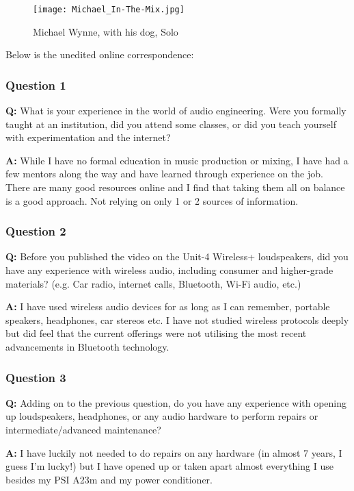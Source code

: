 \documentclass[conference]{IEEEtran}
\begin{document}
\begin{figure}[htbp]
    \centering
    \texttt{[image: Michael\_In-The-Mix.jpg]}
    \caption{Michael Wynne, with his dog, Solo}
    \label{fig:in-the-mix_portrait}
\end{figure}

Below is the unedited online correspondence:

\subsubsection*{Question 1}
\textbf{Q:} What is your experience in the world of audio engineering. Were you formally
taught at an institution, did you attend some classes, or did you teach yourself with
experimentation and the internet?

\textbf{A:} While I have no formal education in music production or mixing, I have had a few
mentors along the way and have learned through experience on the job. There are many good
resources online and I find that taking them all on balance is a good approach. Not relying
on only 1 or 2 sources of information. \cite{wynne_interviewing_2023}

\subsubsection*{Question 2}
\textbf{Q:} Before you published the video on the Unit-4 Wireless+ loudspeakers, did you have
any experience with wireless audio, including consumer and higher-grade materials? (e.g. Car
radio, internet calls, Bluetooth, Wi-Fi audio, etc.)


\textbf{A:}  I have used wireless audio devices for as long as I can remember, portable
speakers, headphones, car stereos etc. I have not studied wireless protocols deeply but did
feel that the current offerings were not utilising the most recent advancements in Bluetooth
technology. \cite{wynne_interviewing_2023}

\subsubsection*{Question 3}
\textbf{Q:} Adding on to the previous question, do you have any experience with opening up
loudspeakers, headphones, or any audio hardware to perform repairs or intermediate/advanced
maintenance?

\textbf{A:} I have luckily not needed to do repairs on any hardware (in almost 7 years, I
guess I'm lucky!) but I have opened up or taken apart almost everything I use besides my PSI
A23m and my power conditioner. \cite{wynne_interviewing_2023}
\end{document}
